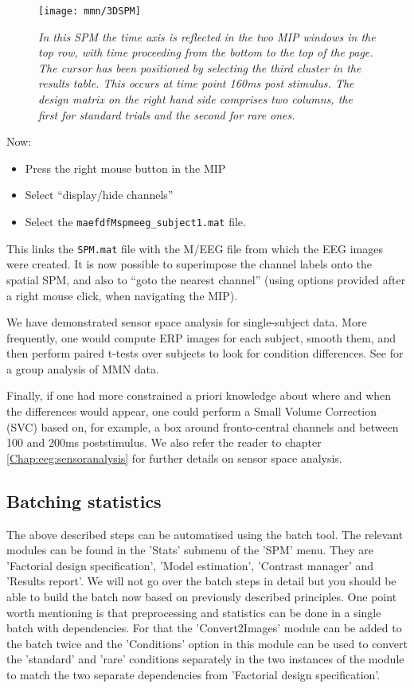  \begin{figure}
\begin{center}
\texttt{[image: mmn/3DSPM]}
\caption{\em In this SPM the time axis is reflected in the two MIP windows in the top row, with time proceeding from the bottom to the top of the page. The cursor has been positioned by selecting the third cluster in the results table. This occurs at time point 160ms post stimulus. The design matrix on the right hand side comprises two columns, the first for standard trials and the second for rare ones. \label{3DSPM}}
\end{center}
\end{figure}
Now:
\begin{itemize}
\item{Press the right mouse button in the MIP}
\item{Select ``display/hide channels''}
\item{Select the \texttt{maefdfMspmeeg\_subject1.mat} file.}
\end{itemize}
This links the \texttt{SPM.mat} file with the M/EEG file from which the EEG images were created.
It is now possible to superimpose the channel labels onto the spatial SPM, and also to ``goto the nearest channel'' (using options provided after a right mouse click, when navigating the MIP).

We have demonstrated sensor space analysis for single-subject data. More frequently, one would compute ERP images for each subject, smooth them, and then perform paired t-tests over subjects to look for condition differences. See \cite{marta_mmndcm} for a group analysis of MMN data.

Finally, if one had more constrained a priori knowledge about where and when the differences would appear, one could perform a Small Volume Correction (SVC) based on, for example, a box around fronto-central channels and between 100 and 200ms poststimulus. We also refer the reader to chapter \ref{Chap:eeg:sensoranalysis} for further details on sensor space analysis.

\subsection{Batching statistics}
The above described steps can be automatised using the batch tool. The relevant modules can be found in the 'Stats' submenu of the 'SPM' menu. They are 'Factorial design specification', 'Model estimation', 'Contrast manager' and 'Results report'. We will not go over the batch steps in detail but you should be able to build the batch now based on previously described principles. One point worth mentioning is that preprocessing and statistics can be done in a single batch with dependencies. For that the 'Convert2Images' module can be added to the batch twice and the 'Conditions' option in this module can be used to convert the 'standard' and 'rare' conditions separately  in the two instances of the module to match the two separate dependencies from 'Factorial design specification'.

